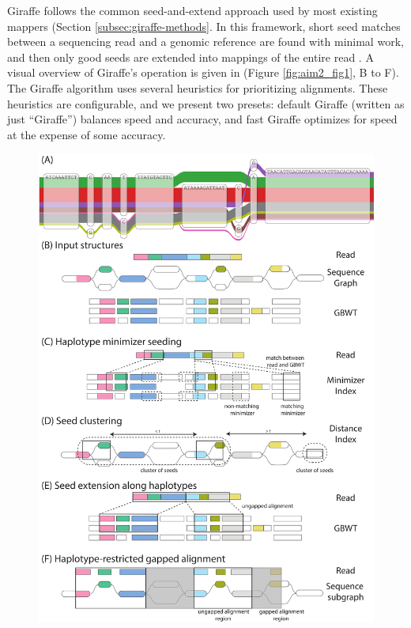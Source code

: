 \documentclass[11pt]{ucscthesis}
\begin{document}
Giraffe follows the common seed-and-extend approach used by most existing mappers (Section \ref{subsec:giraffe-methods}.
In this framework, short seed matches between a sequencing read and a genomic reference are found with minimal work, and then only good seeds are extended into mappings of the entire read \cite{langmead_bowtie2_2012,li_bwa_mem_2013,li_minimap2_2018}.
A visual overview of Giraffe’s operation is given in (Figure \ref{fig:aim2_fig1}, B to F).
The Giraffe algorithm uses several heuristics for prioritizing alignments.
These heuristics are configurable, and we present two presets: default Giraffe (written as just “Giraffe”) balances speed and accuracy, and fast Giraffe optimizes for speed at the expense of some accuracy.
\begin{figure}
    \centering
    \includegraphics[width=.5\linewidth]{aim2_fig1.pdf}

\end{figure}
\end{document}
